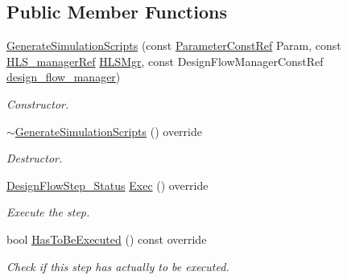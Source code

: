 \subsection*{Public Member Functions}
\begin{DoxyCompactItemize}
\item 
\hyperlink{classGenerateSimulationScripts_a9e5e2b9eacb44754a15a4120a84c083f}{Generate\+Simulation\+Scripts} (const \hyperlink{Parameter_8hpp_a37841774a6fcb479b597fdf8955eb4ea}{Parameter\+Const\+Ref} Param, const \hyperlink{hls__manager_8hpp_acd3842b8589fe52c08fc0b2fcc813bfe}{H\+L\+S\+\_\+manager\+Ref} \hyperlink{classHLS__step_ade85003a99d34134418451ddc46a18e9}{H\+L\+S\+Mgr}, const Design\+Flow\+Manager\+Const\+Ref \hyperlink{classDesignFlowStep_ab770677ddf087613add30024e16a5554}{design\+\_\+flow\+\_\+manager})
\begin{DoxyCompactList}\small\item\em Constructor. \end{DoxyCompactList}\item 
\hyperlink{classGenerateSimulationScripts_a381cd9df3c89a17d96b29d7f0c347411}{$\sim$\+Generate\+Simulation\+Scripts} () override
\begin{DoxyCompactList}\small\item\em Destructor. \end{DoxyCompactList}\item 
\hyperlink{design__flow__step_8hpp_afb1f0d73069c26076b8d31dbc8ebecdf}{Design\+Flow\+Step\+\_\+\+Status} \hyperlink{classGenerateSimulationScripts_a58904865494c7a37559bb0490f5ee3a6}{Exec} () override
\begin{DoxyCompactList}\small\item\em Execute the step. \end{DoxyCompactList}\item 
bool \hyperlink{classGenerateSimulationScripts_ab03643b6186e247c72faeb97f3e96e7b}{Has\+To\+Be\+Executed} () const override
\begin{DoxyCompactList}\small\item\em Check if this step has actually to be executed. \end{DoxyCompactList}\end{DoxyCompactItemize}

